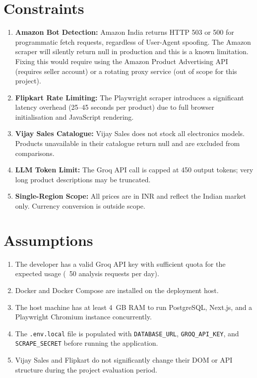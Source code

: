 \documentclass[12pt,a4paper]{report}
\begin{document}
\section{Constraints}
\begin{enumerate}[noitemsep]
  \item \textbf{Amazon Bot Detection:} Amazon India returns HTTP 503 or 500
        for programmatic fetch requests, regardless of User-Agent spoofing.
        The Amazon scraper will silently return null in production and this
        is a known limitation. Fixing this would require using the Amazon
        Product Advertising API (requires seller account) or a rotating
        proxy service (out of scope for this project).
  \item \textbf{Flipkart Rate Limiting:} The Playwright scraper introduces a
        significant latency overhead (25--45 seconds per product) due to
        full browser initialisation and JavaScript rendering.
  \item \textbf{Vijay Sales Catalogue:} Vijay Sales does not stock all
        electronics models. Products unavailable in their catalogue return
        null and are excluded from comparisons.
  \item \textbf{LLM Token Limit:} The Groq API call is capped at 450 output
        tokens; very long product descriptions may be truncated.
  \item \textbf{Single-Region Scope:} All prices are in INR and reflect the
        Indian market only. Currency conversion is outside scope.
\end{enumerate}

\section{Assumptions}
\begin{enumerate}[noitemsep]
  \item The developer has a valid Groq API key with sufficient quota for the
        expected usage (~50 analysis requests per day).
  \item Docker and Docker Compose are installed on the deployment host.
  \item The host machine has at least 4~GB RAM to run PostgreSQL, Next.js,
        and a Playwright Chromium instance concurrently.
  \item The \texttt{.env.local} file is populated with \texttt{DATABASE\_URL},
        \texttt{GROQ\_API\_KEY}, and \texttt{SCRAPE\_SECRET} before running
        the application.
  \item Vijay Sales and Flipkart do not significantly change their DOM or
        API structure during the project evaluation period.
\end{enumerate}
\end{document}
